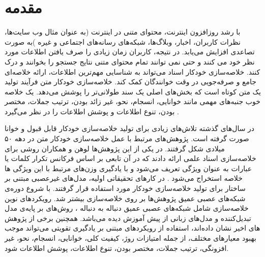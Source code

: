 \chapter{مقدمه}
با رشد روزافزون اینترنت، محتوای متنی در اینترنت (به عنوان مثال وب سایت‌ها، نظرات کاربران، اخبار، وبلاگ‌ها، شبکه‌های رسانه‌های اجتماعی و غیره )به صورت تصاعدی افزایش می‌یابد. در نتیجه، کاربران زمان زیادی را صرف یافتن اطلاعات مورد نظر خود می کنند و حتی نمی توانند تمام محتوای متنی نتایج جستجو را بخوانند و درک کنند. خلاصه‌سازی خودکار اسناد می‌تواند به شناسایی مهم‌ترین اطلاعات، ارائه خلاصه‌ای جامع و صرفه‌جویی در وقت خوانندگان کمک کند. خلاصه‌سازی خودکار متن فرآیند تولید یک متن کوتاه است که بخش‌های اصلی یک سند طولانی‌تر را پوشش می‌دهد. یک خلاصه خوب جنبه‌های مهمی مانند خوانایی، انسجام، نحو، غیر زائد بودن، ترتیب جملات، مختصر بودن، تنوع اطلاعات و پوشش اطلاعات را در نظر می‌گیرد
\cite{ELKASSAS2021113679}
.


در سال‌های گذشته تلاش‌های زیادی برای تولید خلاصه‌سازی خودکار قابل قبول و خوانا صورت گرفته است. 
پژوهش‌های مرتبط با عمل خلاصه‌سازی خودکار متن در دهه ۵۰ میلادی شکل گرفتند. در یکی از این پژوهش‌ها لوهن و همکاران روشی برای خلاصه‌سازی اسناد علمی ‌ارائه دادند که در آن تابعی بر اساس فرکانس تکرار کلمات یا عبارات به عنوان ویژگی تعریف ‌می‌شود و با یادگیری وزن‌های مرتبط با این ویژگی ها خلاصه استخراج می‌شود
\cite{luhn1958automatic}.
در کارهای تحقیقاتی اولیه، مدل‌های غیرعصبی  مبتنی بر ساختار برای تولید خلاصه‌سازی خودکار مورد استفاده قرار گرفتند. با شروع دوره‌ی شبکه‌های عصبی عمیق پژوهش‌ها بر روی خلاصه‌سازی بیشتر شد. رویکرد‌های نوین خلاصه‌سازی شامل شبکه‌های عصبی عمیق دنباله به دنباله
، روش‌های بر پایه‌ی مدل تبدیل‌کننده
و مدل‌های زبانی از پیش آموزش دیده
می‌باشد. 
همچنین برخی از پژوهش های اخیر نشان داده‌اند، استفاده از رویکردهای مبتنی بر یادگیری تقویتی
می‌تواند موجب بهبود معیارهای مختلف، از جمله امتیازات روژ، کیفیت کلی، خوانایی، انسجام، نحو، غیر افزونگی، ترتیب جملات، مختصر بودن، تنوع اطلاعات، پوشش اطلاعات شود. 


